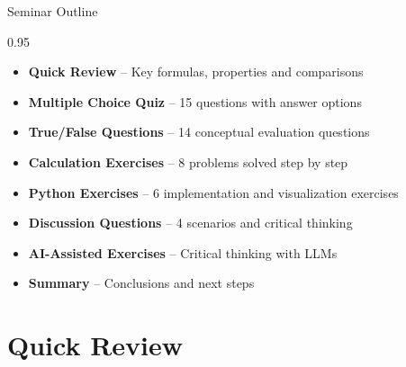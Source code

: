 \documentclass[9pt, aspectratio=169, t]{beamer}
\subtitle{Seminar 2: Classical Distributions --- Normal, Student-$t$ and Pareto}
\begin{document}
{
\begin{frame}
    \titlepage
\end{frame}
}


\begin{frame}{Seminar Outline}
    \begin{cminipage}{0.95\textwidth}
    \begin{itemize}\setlength{\itemsep}{0pt}
        \item \textbf{Quick Review} -- Key formulas, properties and comparisons
        \vspace{0.15cm}
        \item \textbf{Multiple Choice Quiz} -- 15 questions with answer options
        \vspace{0.15cm}
        \item \textbf{True/False Questions} -- 14 conceptual evaluation questions
        \vspace{0.15cm}
        \item \textbf{Calculation Exercises} -- 8 problems solved step by step
        \vspace{0.15cm}
        \item \textbf{Python Exercises} -- 6 implementation and visualization exercises
        \vspace{0.15cm}
        \item \textbf{Discussion Questions} -- 4 scenarios and critical thinking
        \vspace{0.15cm}
        \item \textbf{AI-Assisted Exercises} -- Critical thinking with LLMs
        \vspace{0.15cm}
        \item \textbf{Summary} -- Conclusions and next steps
    \end{itemize}
    \end{cminipage}
\end{frame}

\section{Quick Review}
\end{document}
